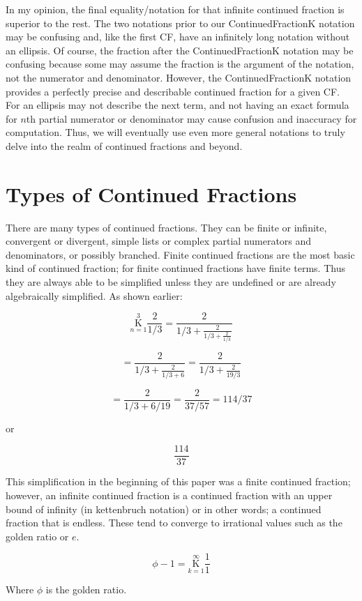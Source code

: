 \documentclass{article}
\begin{document}
In my opinion, the final equality/notation for that infinite continued fraction is superior to the rest. The two notations prior to our ContinuedFractionK notation may be confusing and, like the first CF, have an infinitely long notation without an ellipsis. Of course, the fraction after the ContinuedFractionK notation may be confusing because some may assume the fraction is the argument of the notation, not the numerator and denominator. However, the ContinuedFractionK notation provides a perfectly precise and describable continued fraction for a given CF. For an ellipsis may not describe the next term, and not having an exact formula for $n$th partial numerator or denominator may cause confusion and inaccuracy for computation. Thus, we will eventually use even more general notations to truly delve into the realm of continued fractions and beyond.

\section{Types of Continued Fractions}

There are many types of continued fractions. They can be finite or infinite, convergent or divergent, simple lists or complex partial numerators and denominators, or possibly branched. Finite continued fractions are the most basic kind of continued fraction; for finite continued fractions have finite terms. Thus they are always able to be simplified unless they are undefined or are already algebraically simplified. As shown earlier:

$$ \underset{n=1}{\overset{3}{ \mathrm K}} \frac{2}{1/3} = \frac{2}{1/3 + \frac{2}{1/3 + \frac{2}{1/3}}} $$

$$= \frac{2}{1/3 + \frac{2}{1/3 + 6}} = \frac{2}{1/3 + \frac{2}{19/3}} $$

$$= \frac{2}{1/3 + 6/19} = \frac{2}{37/57} = 114/37 $$

or

$$\frac{114}{37}$$

This simplification in the beginning of this paper was a finite continued fraction; however, an infinite continued fraction is a continued fraction with an upper bound of infinity (in kettenbruch notation) or in other words; a continued fraction that is endless. These tend to converge to irrational values such as the golden ratio or $e$.

$$\phi - 1 = \underset{k=1}{\overset{\infty}{ \mathrm K}} \frac{1}{1}$$

Where $\phi$ is the golden ratio.
\end{document}
